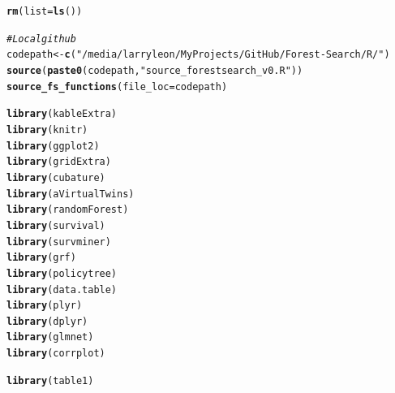 \documentclass[smallextended]{svjour3}
\makeatletter
\newcommand{\hlstr}[1]{\textcolor[rgb]{0.192,0.494,0.8}{#1}}%
\newcommand{\hlcom}[1]{\textcolor[rgb]{0.678,0.584,0.686}{\textit{#1}}}%
\newcommand{\hlstd}[1]{\textcolor[rgb]{0.345,0.345,0.345}{#1}}%
\newcommand{\hlkwb}[1]{\textcolor[rgb]{0.69,0.353,0.396}{#1}}%
\newcommand{\hlkwc}[1]{\textcolor[rgb]{0.333,0.667,0.333}{#1}}%
\newcommand{\hlkwd}[1]{\textcolor[rgb]{0.737,0.353,0.396}{\textbf{#1}}}%
\newenvironment{kframe}{%
 \def\at@end@of@kframe{}%
 \ifinner\ifhmode%
  \def\at@end@of@kframe{\end{minipage}}%
  \begin{minipage}{\columnwidth}%
 \fi\fi%
 \def\FrameCommand##1{\hskip\@totalleftmargin \hskip-\fboxsep
 \colorbox{shadecolor}{##1}\hskip-\fboxsep
     \hskip-\linewidth \hskip-\@totalleftmargin \hskip\columnwidth}%
 \MakeFramed {\advance\hsize-\width
   \@totalleftmargin\z@ \linewidth\hsize
   \@setminipage}}%
 {\par\unskip\endMakeFramed%
 \at@end@of@kframe}
\newenvironment{knitrout}{}{} %
\makeatother
\begin{document}
\begin{knitrout}
\color{fgcolor}\begin{kframe}
\begin{alltt}
\hlkwd{rm}\hlstd{(}\hlkwc{list} \hlstd{=} \hlkwd{ls}\hlstd{())}

\hlcom{# Local github}
\hlstd{codepath} \hlkwb{<-} \hlkwd{c}\hlstd{(}\hlstr{"/media/larryleon/My Projects/GitHub/Forest-Search/R/"}\hlstd{)}
\hlkwd{source}\hlstd{(}\hlkwd{paste0}\hlstd{(codepath,} \hlstr{"source_forestsearch_v0.R"}\hlstd{))}
\hlkwd{source_fs_functions}\hlstd{(}\hlkwc{file_loc} \hlstd{= codepath)}

\hlkwd{library}\hlstd{(kableExtra)}
\hlkwd{library}\hlstd{(knitr)}
\hlkwd{library}\hlstd{(ggplot2)}
\hlkwd{library}\hlstd{(gridExtra)}
\hlkwd{library}\hlstd{(cubature)}
\hlkwd{library}\hlstd{(aVirtualTwins)}
\hlkwd{library}\hlstd{(randomForest)}
\hlkwd{library}\hlstd{(survival)}
\hlkwd{library}\hlstd{(survminer)}
\hlkwd{library}\hlstd{(grf)}
\hlkwd{library}\hlstd{(policytree)}
\hlkwd{library}\hlstd{(data.table)}
\hlkwd{library}\hlstd{(plyr)}
\hlkwd{library}\hlstd{(dplyr)}
\hlkwd{library}\hlstd{(glmnet)}
\hlkwd{library}\hlstd{(corrplot)}

\hlkwd{library}\hlstd{(table1)}
\end{alltt}
\end{kframe}
\end{knitrout}
\end{document}
